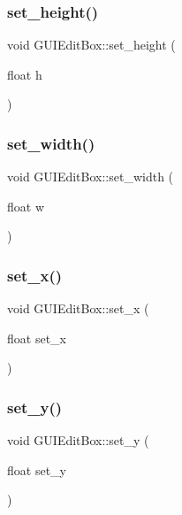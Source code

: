 \subsubsection{\texorpdfstring{set\+\_\+height()}{set\_height()}}
{\footnotesize\ttfamily void G\+U\+I\+Edit\+Box\+::set\+\_\+height (\begin{DoxyParamCaption}\item[{float}]{h }\end{DoxyParamCaption})}

\hypertarget{class_g_u_i_edit_box_a3820d5b7ab4deb52e9c70ea3231e12a6}{}\label{class_g_u_i_edit_box_a3820d5b7ab4deb52e9c70ea3231e12a6} 
\subsubsection{\texorpdfstring{set\+\_\+width()}{set\_width()}}
{\footnotesize\ttfamily void G\+U\+I\+Edit\+Box\+::set\+\_\+width (\begin{DoxyParamCaption}\item[{float}]{w }\end{DoxyParamCaption})}

\hypertarget{class_g_u_i_edit_box_a1d8242676575f6c05e70150c734d94c0}{}\label{class_g_u_i_edit_box_a1d8242676575f6c05e70150c734d94c0} 
\subsubsection{\texorpdfstring{set\+\_\+x()}{set\_x()}}
{\footnotesize\ttfamily void G\+U\+I\+Edit\+Box\+::set\+\_\+x (\begin{DoxyParamCaption}\item[{float}]{set\+\_\+x }\end{DoxyParamCaption})}

\hypertarget{class_g_u_i_edit_box_a9490c2379e29ff6409694369bdbc0f10}{}\label{class_g_u_i_edit_box_a9490c2379e29ff6409694369bdbc0f10} 
\subsubsection{\texorpdfstring{set\+\_\+y()}{set\_y()}}
{\footnotesize\ttfamily void G\+U\+I\+Edit\+Box\+::set\+\_\+y (\begin{DoxyParamCaption}\item[{float}]{set\+\_\+y }\end{DoxyParamCaption})}

